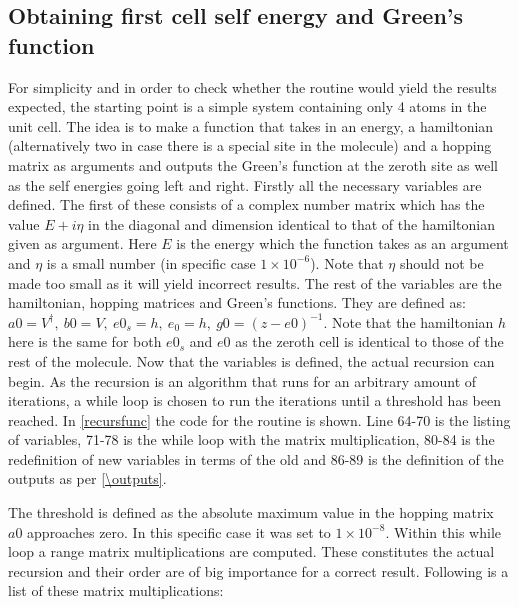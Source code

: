 \subsection{Obtaining first cell self energy and Green's function}\label{recursionroutinesec}
For simplicity and in order to check whether the routine would yield the results expected, the starting point is a simple system containing only 4 atoms in the unit cell. The idea is to make a function that takes in an energy, a hamiltonian (alternatively two in case there is a special site in the molecule) and a hopping matrix as arguments and outputs the Green's function at the zeroth site as well as the self energies going left and right. Firstly all the necessary variables are defined. The first of these consists of a complex number matrix which has the value \(E + i\eta\) in the diagonal and dimension identical to that of the hamiltonian given as argument. Here \(E\) is the energy which the function takes as an argument and \(\eta\) is a small number (in specific case \(1\times10^{-6}\)). Note that \(\eta\) should not be made too small as it will yield incorrect results. The rest of the variables are the hamiltonian, hopping matrices and Green's functions. They are defined as: \(a0 = V^{\dagger}, \ b0 = V, \ e0_{s} = h, \ e_{0} = h, \ g0 = (z-e0)^{-1}\). Note that the hamiltonian \(h\) here is the same for both \(e0_{s}\) and \(e0\) as the zeroth cell is identical to those of the rest of the molecule. Now that the variables is defined, the actual recursion can begin. As the recursion is an algorithm that runs for an arbitrary amount of iterations, a while loop is chosen to run the iterations until a threshold has been reached. In \cref{recursfunc} the code for the routine is shown. Line 64-70 is the listing of variables, 71-78 is the while loop with the matrix multiplication, 80-84 is the redefinition of new variables in terms of the old and 86-89 is the definition of the outputs as per \cref{\outputs}.\\
\noindent
\begin{listing}
    \begin{minipage}[t]{.2\textwidth}
    \end{minipage}
\end{listing}
\begin{listing}
    \begin{minipage}[t]{.45\textwidth}
    \end{minipage}
\end{listing}The threshold is defined as the absolute maximum value in the hopping matrix \(a0\) approaches zero. In this specific case it was set to \(1\times10^{-8} \). Within this while loop a range matrix multiplications are computed. These constitutes the actual recursion and their order are of big importance for a correct result. Following is a list of these matrix multiplications: 
